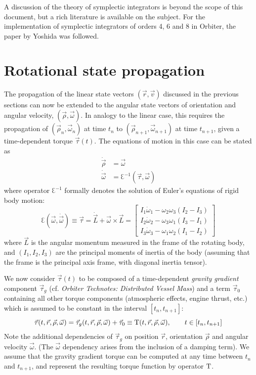 \documentclass[a4paper]{article}
\begin{document}
A discussion of the theory of symplectic integrators is beyond the scope of this document, but a rich literature is available on the subject. For the implementation of symplectic integrators of orders 4, 6 and 8 in Orbiter, the paper by Yoshida \cite{yoshida1990} was followed.

\section{Rotational state propagation}
The propagation of the linear state vectors $(\vec{r},\vec{v})$ discussed in the previous sections can now be extended to the angular state vectors of orientation and angular velocity, $(\vec{\rho},\vec{\omega})$. In analogy to the linear case, this requires the propagation of $(\vec{\rho}_n,\vec{\omega}_n)$ at time $t_n$ to $(\vec{\rho}_{n+1},\vec{\omega}_{n+1})$ at time $t_{n+1}$, given a time-dependent torque $\vec{\tau}(t)$.
The equations of motion in this case can be stated as
\begin{equation}
\begin{split}
\dot{\vec{\rho}} &= \vec\omega \\
\dot{\vec{\omega}} &= \Euler^{-1}(\vec\tau,\vec\omega)
\end{split}
\end{equation}
where operator $\Euler^{-1}$ formally denotes the solution of Euler's equations of rigid body motion:
\begin{equation}
\Euler(\vec\omega,\dot{\vec\omega}) \equiv \vec\tau = 
\dot{\vec{L}}+\vec\omega \times \vec{L} =
\left[
\begin{array}{ccc}
I_1\dot\omega_1 - \omega_2\omega_3(I_2-I_3) \\
I_2\dot\omega_2 - \omega_3\omega_1(I_3-I_1) \\
I_3\dot\omega_3 - \omega_1\omega_2(I_1-I_2)
\end{array}
\right]
\end{equation}
where $\vec{L}$ is the angular momentum measured in the frame of the rotating body, and $(I_1,I_2,I_3)$ are the principal moments of inertia of the body (assuming that the frame is the principal axis frame, with diagonal inertia tensor).

We now consider $\vec\tau(t)$ to be composed of a time-dependent \emph{gravity gradient} component $\vec\tau_g$ (cf. \emph{Orbiter Technotes: Distributed Vessel Mass}) and a term $\vec\tau_0$ containing all other torque components (atmospheric effects, engine thrust, etc.) which is assumed to be constant in the interval $[t_n, t_{n+1}]$:
\begin{equation}
\vec\tau(t,\vec{r},\vec\rho,\vec\omega) = \vec\tau_g(t,\vec{r},\vec\rho,\vec\omega) + \vec\tau_0 \equiv \mathrm{T}(t,\vec{r},\vec\rho,\vec\omega), \qquad t \in [t_n, t_{n+1}]
\end{equation}
Note the additional dependencies of $\vec\tau_g$ on position $\vec{r}$, orientation $\vec\rho$ and angular velocity $\vec\omega$. (The $\vec\omega$ dependency arises from the inclusion of a damping term).
We assume that the gravity gradient torque can be computed at any time between $t_n$ and $t_{n+1}$, and represent the resulting torque function by operator $\mathrm{T}$.
\end{document}
